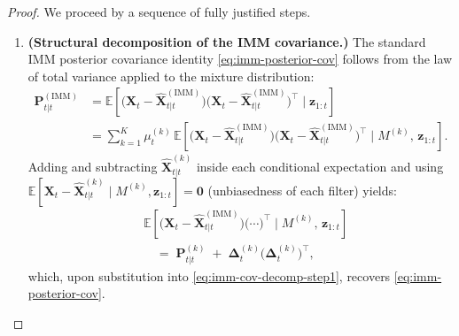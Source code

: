 \documentclass[12pt,openany]{book}
\numberwithin{equation}{chapter}
\theoremstyle{plain}
\theoremstyle{definition}
\theoremstyle{remark}
\def\mathcal#1{#1}%
\begin{document}
\begin{proof}
We proceed by a sequence of fully justified steps.

\begin{enumerate}

  \item \textbf{(Structural decomposition of the IMM covariance.)}
        The standard IMM posterior covariance identity
        \eqref{eq:imm-posterior-cov} follows from the law of
        total variance applied to the mixture distribution:
        \begin{align}
          \mathbf{P}_{t|t}^{(\mathrm{IMM})}
          &= \mathbb{E}\!\left[
               \bigl(\mathbf{X}_t -
               \hat{\mathbf{X}}_{t|t}^{(\mathrm{IMM})}\bigr)
               \bigl(\mathbf{X}_t -
               \hat{\mathbf{X}}_{t|t}^{(\mathrm{IMM})}\bigr)^\top
               \mid \mathbf{z}_{1:t}
             \right] \nonumber \\
          &= \sum_{k=1}^{K} \mu_t^{(k)}\,
             \mathbb{E}\!\left[
               \bigl(\mathbf{X}_t -
               \hat{\mathbf{X}}_{t|t}^{(\mathrm{IMM})}\bigr)
               \bigl(\mathbf{X}_t -
               \hat{\mathbf{X}}_{t|t}^{(\mathrm{IMM})}\bigr)^\top
               \mid \mathcal{M}^{(k)},\,\mathbf{z}_{1:t}
             \right].
          \label{eq:imm-cov-decomp-step1}
        \end{align}
        Adding and subtracting $\hat{\mathbf{X}}_{t|t}^{(k)}$
        inside each conditional expectation and using
        $\mathbb{E}[\mathbf{X}_t - \hat{\mathbf{X}}_{t|t}^{(k)}
        \mid \mathcal{M}^{(k)}, \mathbf{z}_{1:t}] = \mathbf{0}$
        (unbiasedness of each filter) yields:
        \begin{align}
          &\mathbb{E}\!\left[
            \bigl(\mathbf{X}_t -
            \hat{\mathbf{X}}_{t|t}^{(\mathrm{IMM})}\bigr)
            \bigl(\cdots\bigr)^\top
            \mid \mathcal{M}^{(k)},\,\mathbf{z}_{1:t}
          \right] \nonumber \\
          &\quad=\;
          \mathbf{P}_{t|t}^{(k)}
          \;+\;
          \boldsymbol{\Delta}_t^{(k)}
          \bigl(\boldsymbol{\Delta}_t^{(k)}\bigr)^\top,
          \label{eq:imm-cov-decomp-step2}
        \end{align}
        which, upon substitution into
        \eqref{eq:imm-cov-decomp-step1}, recovers
        \eqref{eq:imm-posterior-cov}.


\end{enumerate}
\end{proof}
\end{document}
